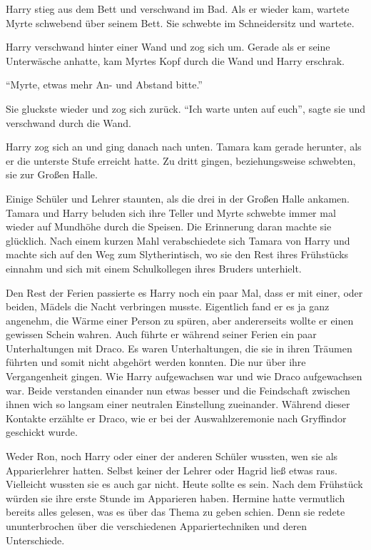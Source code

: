 Harry stieg aus dem Bett und verschwand im Bad. Als er wieder kam, wartete Myrte schwebend über seinem Bett. Sie schwebte im Schneidersitz und wartete.

Harry verschwand hinter einer Wand und zog sich um. Gerade als er seine Unterwäsche anhatte, kam Myrtes Kopf durch die Wand und Harry erschrak.

\enquote{Myrte, etwas mehr An- und Abstand bitte.}

Sie gluckste wieder und zog sich zurück. \enquote{Ich warte unten auf euch}, sagte sie und verschwand durch die Wand.

Harry zog sich an und ging danach nach unten. Tamara kam gerade herunter, als er die unterste Stufe erreicht hatte. Zu dritt gingen, beziehungsweise schwebten, sie zur Großen Halle.

Einige Schüler und Lehrer staunten, als die drei in der Großen Halle ankamen. Tamara und Harry beluden sich ihre Teller und Myrte schwebte immer mal wieder auf Mundhöhe durch die Speisen. Die Erinnerung daran machte sie glücklich. Nach einem kurzen Mahl verabschiedete sich Tamara von Harry und machte sich auf den Weg zum Slytherintisch, wo sie den Rest ihres Frühstücks einnahm und sich mit einem Schulkollegen ihres Bruders unterhielt.

Den Rest der Ferien passierte es Harry noch ein paar Mal, dass er mit einer, oder beiden, Mädels die Nacht verbringen musste. Eigentlich fand er es ja ganz angenehm, die Wärme einer Person zu spüren, aber andererseits wollte er einen gewissen Schein wahren. Auch führte er während seiner Ferien ein paar Unterhaltungen mit Draco. Es waren Unterhaltungen, die sie in ihren Träumen führten und somit nicht abgehört werden konnten. Die nur über ihre Vergangenheit gingen. Wie Harry aufgewachsen war und wie Draco aufgewachsen war. Beide verstanden einander nun etwas besser und die Feindschaft zwischen ihnen wich so langsam einer neutralen Einstellung zueinander. Während dieser Kontakte erzählte er Draco, wie er bei der Auswahlzeremonie nach Gryffindor geschickt wurde.

\trenn

Weder Ron, noch Harry oder einer der anderen Schüler wussten, wen sie als Apparierlehrer hatten. Selbst keiner der Lehrer oder Hagrid ließ etwas raus. Vielleicht wussten sie es auch gar nicht. Heute sollte es sein. Nach dem Frühstück würden sie ihre erste Stunde im Apparieren haben. Hermine hatte vermutlich bereits alles gelesen, was es über das Thema zu geben schien. Denn sie redete ununterbrochen über die verschiedenen Appariertechniken und deren Unterschiede.


